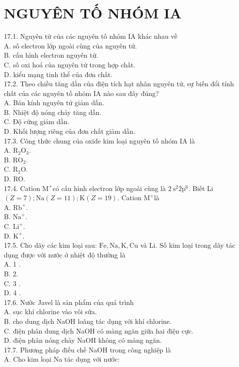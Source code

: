 \documentclass[10pt]{article}
\begin{document}
\section*{NGUYÊN TỐ NHÓM IA}
17.1. Nguyên tử của các nguyên tố nhóm IA khác nhau về\\
A. số electron lớp ngoài cùng của nguyên tử.\\
B. cấu hình electron nguyên tử.\\
C. số oxi hoá của nguyên tử trong hợp chất.\\
D. kiểu mạng tinh thể của đơn chất.\\
17.2. Theo chiều tăng dần của điện tích hạt nhân nguyên tử, sự biến đổi tính chất của các nguyên tố nhóm IA nào sau đây đúng?\\
A. Bán kính nguyên tử giảm dần.\\
B. Nhiệt độ nóng chảy tăng dần.\\
C. Độ cứng giảm dần.\\
D. Khối lượng riêng của đơn chất giảm dần.\\
17.3. Công thức chung của oxide kim loại nguyên tố nhóm IA là\\
A. $\mathrm{R}_{2} \mathrm{O}_{3}$.\\
B. $\mathrm{RO}_{2}$.\\
C. $\mathrm{R}_{2} \mathrm{O}$.\\
D. RO.\\
17.4. Cation $\mathrm{M}^{+}$có cấu hình electron lớp ngoài cùng là $2 \mathrm{~s}^{2} 2 \mathrm{p}^{6}$. Biết Li $(Z=7) ; \mathrm{Na}(Z=11) ; \mathrm{K}(Z=19)$. Cation $\mathrm{M}^{+}$là\\
A. $\mathrm{Rb}^{+}$.\\
B. $\mathrm{Na}^{+}$.\\
C. $\mathrm{Li}^{+}$.\\
D. $\mathrm{K}^{+}$.\\
17.5. Cho dãy các kim loại sau: $\mathrm{Fe}, \mathrm{Na}, \mathrm{K}, \mathrm{Cu}$ và Li. Số kim loại trong dãy tác dụng được với nước ở nhiệt độ thường là\\
A. 1 .\\
B. 2.\\
C. 3 .\\
D. 4 .\\
17.6. Nước Javel là sản phẩm của quá trình\\
A. sục khí chlorine vào vôi sữa.\\
B. cho dung dịch NaOH loãng tác dụng với khí chlorine.\\
C. điện phân dung dịch NaOH có màng ngăn giữa hai điện cực.\\
D. điện phân nóng chảy NaOH không có màng ngăn.\\
17.7. Phương pháp điều chế NaOH trong công nghiệp là\\
A. Cho kim loại Na tác dụng với nước:
\end{document}
